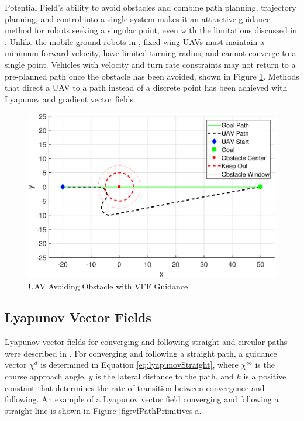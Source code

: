 \documentclass[numbered,pdftex]{ohio-etd}
\begin{document}
Potential Field's ability to avoid obstacles and combine path planning, trajectory planning, and control into a single system makes it an attractive guidance method for robots seeking a singular point, even with the limitations discussed in \cite{koren_potential_1991}. Unlike the mobile ground robots in \cite{borenstein_real-time_1990}, fixed wing UAVs must maintain a minimum forward velocity, have limited turning radius, and cannot converge to a single point. Vehicles with velocity and turn rate constraints may not return to a pre-planned path once the obstacle has been avoided, shown in Figure \ref{fig:vffSimulated}. Methods that direct a UAV to a path instead of a discrete point has been achieved with Lyapunov and gradient vector fields. 


\begin{figure}[H]
	\centering
	\includegraphics[width=15cm]{PaperFigures/Literature/vffSimulated}
	\caption{UAV Avoiding Obstacle with VFF Guidance}
	\label{fig:vffSimulated}
\end{figure}



\subsection{Lyapunov Vector Fields}
Lyapunov vector fields for converging and following straight and circular paths were described in \cite{nelson_cooperative_2005}. For converging and following a straight path, a guidance vector $\chi^{d}$ is determined in Equation \ref{eq:lyapunovStraight}, where $\chi^{\infty}$ is the course approach angle, $y$ is the lateral distance to the path, and $\bar{k}$ is a positive constant that determines the rate of transition between convergence and following. An example of a Lyapunov vector field converging and following a straight line is shown in Figure \ref{fig:vfPathPrimitives}a.
\end{document}
